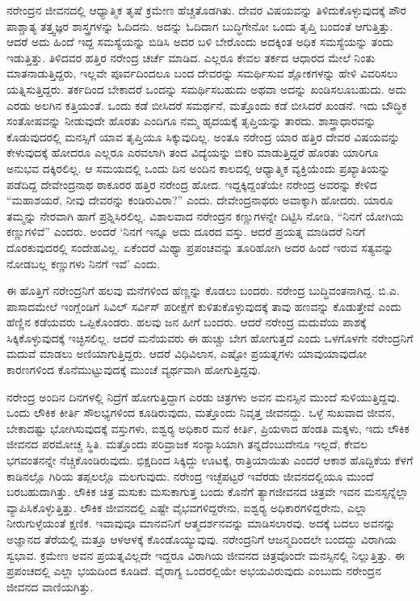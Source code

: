 ನರೇಂದ್ರನ ಜೀವನದಲ್ಲಿ ಆಧ್ಯಾತ್ಮಿಕ ತೃಷೆ ಕ್ರಮೇಣ ಹೆಚ್ಚತೊಡಗಿತು. ದೇವರ ವಿಷಯವನ್ನು ತಿಳಿದುಕೊಳ್ಳುವುದಕ್ಕೆ ಪೌರ ಪಾಶ್ಚಾತ್ಯ ತತ್ತ್ವಜ್ಞರ ಶಾಸ್ತ್ರಗಳನ್ನು ಓದಿದನು. ಅದನ್ನು ಓದಿದಾಗ ಬುದ್ಧಿಗೇನೋ ಒಂದು ತೃಪ್ತಿ ಬಂದಂತೆ ಆಗುತ್ತಿತ್ತು. ಆದರೆ ಅದು ಹಿಂದೆ ಇದ್ದ ಸಮಸ್ಯೆಯನ್ನು ಬಿಡಿಸಿ ಅದರ ಬಳಿ ಬೇರೊಂದು ಅದಕ್ಕಿಂತ ಅಧಿಕ ಸಮಸ್ಯೆಯನ್ನು ತಂದು ಇಡುತ್ತಿತ್ತು. ತಿಳಿದವರ ಹತ್ತಿರ ನರೇಂದ್ರ ಚರ್ಚೆ ಮಾಡಿದ. ಎಲ್ಲರೂ ಕೇವಲ ತರ್ಕದ ಆಧಾರದ ಮೇಲೆ ನಿಂತು ಮಾತನಾಡುತ್ತಿದ್ದರು, ಇಲ್ಲವೇ ಪೂರ್ವದಿಂದಲೂ ಬಂದ ದೇವರನ್ನು ಸಮರ್ಥಿಸುವ ಶ್ಲೋಕಗಳನ್ನು ಹೇಳಿ ವಿವರಿಸಲು ಯತ್ನಿಸುತ್ತಿದ್ದರು. ತರ್ಕದಿಂದ ಬೇಕಾದರೆ ಒಂದನ್ನು ಸಮರ್ಥಿಸಬಹುದು ಅಥವಾ ಅದನ್ನು ಖಂಡಿಸಲೂಬಹುದು. ಅದು ಎರಡು ಅಲಗಿನ ಕತ್ತಿಯಂತೆ. ಒಂದು ಕಡೆ ಬೀಸಿದರೆ ಸಮರ್ಥನೆ, ಮತ್ತೊಂದು ಕಡೆ ಬೀಸಿದರೆ ಖಂಡನೆ. ಇದು ಬೌದ್ಧಿಕ ಸಂತೋಷವನ್ನು ನೀಡುವುದೇ ಹೊರತು ಎಂದಿಗೂ ನಮ್ಮ ಹೃದಯಕ್ಕೆ ತೃಪ್ತಿಯನ್ನು ತಾರದು. ಶಾಸ್ತ್ರಾಧಾರವನ್ನು ಕೊಡುವುದರಲ್ಲಿ ಮನಸ್ಸಿಗೆ ಯಾವ ತೃಪ್ತಿಯೂ ಸಿಕ್ಕುವುದಿಲ್ಲ. ಅಂತೂ ನರೇಂದ್ರ ಯಾರ ಹತ್ತಿರ ದೇವರ ವಿಷಯವನ್ನು ಕೇಳುವುದಕ್ಕೆ ಹೋದರೂ ಎಲ್ಲರೂ ಎರವಲಾಗಿ ತಂದ ವಿದ್ಯೆಯನ್ನು ಬಿಕರಿ ಮಾಡುತ್ತಿದ್ದರೆ ಹೊರತು ಯಾರಿಗೂ ಅನುಭವ ದಕ್ಕಿರಲಿಲ್ಲ. ಆ ಸಮಯದಲ್ಲಿ ಒಂದು ದಿನ ಅಂದಿನ ಕಾಲದಲ್ಲಿ ಆಧ್ಯಾತ್ಮಿಕ ವ್ಯಕ್ತಿಯೆಂದು ಪ್ರಖ್ಯಾತಿಯನ್ನು ಪಡೆದಿದ್ದ ದೇವೇಂದ್ರನಾಥ ಠಾಕೂರರ ಹತ್ತಿರ ನರೇಂದ್ರ ಹೋದ. ಇದ್ದಕ್ಕಿದ್ದಂತೆಯೇ ನರೇಂದ್ರ ಅವರನ್ನು ಕೇಳಿದ “ಮಹಾಶಯರೆ, ನೀವು ದೇವರನ್ನು ಕಂಡಿರುವಿರಾ?” ಎಂದು. ದೇವೇಂದ್ರನಾಥರು ಅವಾಕ್ಕಾಗಿ ಹೋದರು. ಯಾರೂ ತಮ್ಮನ್ನು ನೇರವಾಗಿ ಹಾಗೆ ಪ್ರಶ್ನಿಸಿರಲಿಲ್ಲ. ವಿಶಾಲವಾದ ನರೇಂದ್ರನ ಕಣ್ಣುಗಳನ್ನೇ ದಿಟ್ಟಿಸಿ ನೋಡಿ, “ನಿನಗೆ ಯೋಗಿಯ ಕಣ್ಣುಗಳಿವೆ” ಎಂದರು. ಅಂದರೆ ‘ನಿನಗೆ ಇನ್ನೂ ಅದು ದೂರದ ವಸ್ತು. ಆದರೆ ಪ್ರಯತ್ನ ಮಾಡಿದರೆ ನಿನಗೆ ದೊರಕುವುದರಲ್ಲಿ ಸಂದೇಹವಿಲ್ಲ. ಏಕೆಂದರೆ ಮಿಥ್ಯಾ ಪ್ರಪಂಚವನ್ನು ತೂರಿಹೋಗಿ ಅದರ ಹಿಂದೆ ಇರುವ ಸತ್ಯವನ್ನು ನೋಡಬಲ್ಲ ಕಣ್ಣುಗಳು ನಿನಗೆ ಇವೆ’ ಎಂದು.

ಈ ಹೊತ್ತಿಗೆ ನರೇಂದ್ರನಿಗೆ ಹಲವು ಮನೆಗಳಿಂದ ಹೆಣ್ಣನ್ನು ಕೊಡಲು ಬಂದರು. ನರೇಂದ್ರ ಬುದ್ಧಿವಂತನಾಗಿದ್ದ. ಬಿ.ಎ. ಪಾಸಾದಮೇಲೆ ಇಂಗ್ಲೆಂಡಿಗೆ ಸಿವಿಲ್ ಸರ್ವಿಸ್ ಪರೀಕ್ಷೆಗೆ ಕುಳಿತುಕೊಳ್ಳುವುದಕ್ಕೆ ತಾವು ಹಣವನ್ನು ಕೊಡುತ್ತೇವೆ ಎಂದು ಹೆಣ್ಣಿನ ಕಡೆಯವರು ಒಪ್ಪಿಕೊಂಡರು. ಹಲವು ಜನ ಹೀಗೆ ಬಂದರು. ಆದರೆ ನರೇಂದ್ರ ಮದುವೆಯ ಪಾಶಕ್ಕೆ ಸಿಕ್ಕಿಕೊಳ್ಳುವುದಕ್ಕೆ ಇಚ್ಛಿಸಲಿಲ್ಲ. ಆದರೆ ಮನೆಯವರು ಈ ಹುಚ್ಚು ಬೇಗ ಹೋಗುತ್ತದೆ ಎಂದು ಒಳಗೊಳಗೇ ನರೇಂದ್ರನಿಗೆ ಮದುವೆ ಮಾಡಲು ಅಣಿಯಾಗುತ್ತಿದ್ದರು. ಆದರೆ ವಿಧಿವಿಲಾಸ, ಎಷ್ಟೋ ಪ್ರಯತ್ನಗಳು ಯಾವುಯಾವುದೋ ಕಾರಣಗಳಿಂದ ಕೊನೆಮುಟ್ಟುವುದಕ್ಕೆ ಮುಂಚೆ ವ್ಯರ್ಥವಾಗಿ ಹೋಗುತ್ತಿದ್ದವು.

ನರೇಂದ್ರ ಅಂದಿನ ದಿನಗಳಲ್ಲಿ ನಿದ್ರೆಗೆ ಹೋಗುತ್ತಿದ್ದಾಗ ಎರಡು ಚಿತ್ರಗಳು ಅವನ ಮನಸ್ಸಿನ ಮುಂದೆ ಸುಳಿಯುತ್ತಿದ್ದವು. ಒಂದು ಲೌಕಿಕ ಕೀರ್ತಿ ಸೌಲಭ್ಯಗಳಿಂದ ಕೂಡಿರುವುದು, ಮತ್ತೊಂದು ನಿವೃತ್ತ ಜೀವನದ್ದು. ಒಳ್ಳೆ ಸುಖವಾದ ಜೀವನ, ಬೇಕಾದಷ್ಟು ಭೋಗಿಸುವುದಕ್ಕೆ ವಸ್ತುಗಳು, ಐಶ್ವರ‍್ಯ ಅಧಿಕಾರ ಮನೆ ಕೀರ್ತಿ, ಪ್ರಿಯಳಾದ ಹೆಂಡತಿ ಮಕ್ಕಳು, ಇದು ಲೌಕಿಕ ಜೀವನದ ಪರಮೋಚ್ಚ ಸ್ಥಿತಿ. ಮತ್ತೊಂದು ಪರಿವ್ರಾಜಕ ಸಂನ್ಯಾಸಿಯಾಗಿ ತನ್ನದೆಂಬುದೇನೂ ಇಲ್ಲದೆ, ಕೇವಲ ಭಗವಂತನನ್ನೇ ನೆಚ್ಚಿಕೊಂಡಿರುವುದು. ಭಿಕ್ಷದಿಂದ ಸಿಕ್ಕಿದ್ದು ಊಟಕ್ಕೆ, ರಾತ್ರಿಯಾಯಿತು ಎಂದರೆ ಆಕಾಶ ಹೊದ್ದಿಕೆಯ ಕೆಳಗೆ ಕಾಡಿನಲ್ಲೊ ಗಿರಿಯ ತಪ್ಪಲಲ್ಲೊ ಮಲಗುವುದು. ನರೇಂದ್ರ ಇಚ್ಛೆಪಟ್ಟರೆ ಇವೆರಡು ಜೀವನದಲ್ಲಿಯೂ ಮುಂದೆ ಬರಬಹುದಾಗಿತ್ತು. ಲೌಕಿಕ ಚಿತ್ರ ಮಸುಕು ಮಸುಕಾಗುತ್ತ ಬಂದು ಕೊನೆಗೆ ತ್ಯಾಗಜೀವನದ ಚಿತ್ರವೇ ಇವನ ಮನಸ್ಸನ್ನೆಲ್ಲಾ ವ್ಯಾಪಿಸಿಕೊಳ್ಳುತ್ತಿತ್ತು. ಲೌಕಿಕ ಜೀವನದಲ್ಲಿ ಎಷ್ಟೇ ವೈಭವಗಳಿದ್ದರೇನು, ಐಶ್ವರ‍್ಯ ಅಧಿಕಾರಗಳಿದ್ದರೇನು, ಎಲ್ಲಾ ನೀರುಗುಳ್ಳೆಯಂತೆ ಕ್ಷಣಿಕ. ಇವಾವುವೂ ಮಾನವನಿಗೆ ಆತ್ಮದರ್ಶನವನ್ನು ಮಾಡಿಸಲಾರವು. ಅದಕ್ಕೆ ಬದಲು ಅವನನ್ನು ಅಜ್ಞಾನದ ತೆರೆಯಲ್ಲಿ ಮತ್ತೂ ಆಳಆಳಕ್ಕೆ ಕೊಂಡೊಯ್ಯುವುವು. ನರೇಂದ್ರನಿಗೆ ಆಜನ್ಮದಿಂದಲೇ ಬಂದದ್ದು ವಿರಾಗಿಯ ಸ್ವಭಾವ. ಕ್ರಮೇಣ ಅವನ ಪ್ರಯತ್ನವಿಲ್ಲದೇ ಇದ್ದರೂ ವಿರಾಗಿಯ ಜೀವನದ ಚಿತ್ರವೊಂದೇ ಮನಸ್ಸಿನಲ್ಲಿ ನಿಲ್ಲುತ್ತಿತ್ತು. ಈ ಪ್ರಪಂಚದಲ್ಲಿ ಎಲ್ಲಾ ಭಯದಿಂದ ಕೂಡಿದೆ. ವೈರಾಗ್ಯ ಒಂದರಲ್ಲಿಯೇ ಅಭಯವಿರುವುದು ಎಂಬುದು ನರೇಂದ್ರನ ಜೀವನದ ವಾಣಿಯಗಿತ್ತು.

